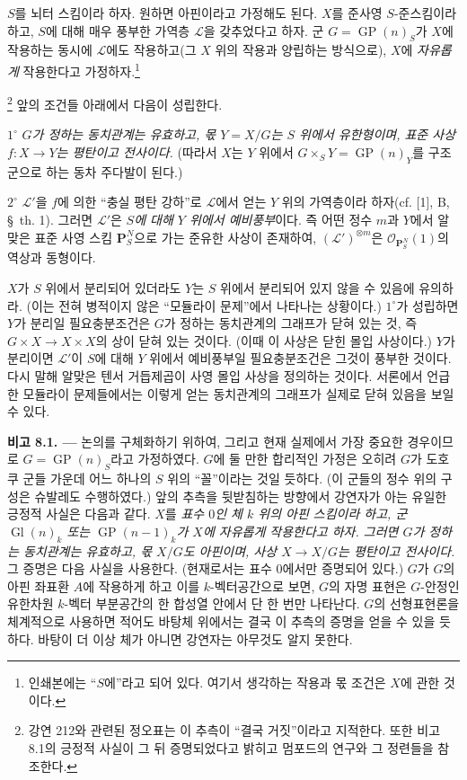 $S$를 뇌터 스킴이라 하자. 원하면 아핀이라고 가정해도 된다. $X$를
준사영 $S$-준스킴이라 하고, $S$에 대해 매우 풍부한 가역층
$\mathcal L$을 갖추었다고 하자. 군 $G=\operatorname{GP}(n)_S$가 $X$에
작용하는 동시에 $\mathcal L$에도 작용하고(그 $X$ 위의 작용과 양립하는
방식으로), $X$에 \emph{자유롭게} 작용한다고 가정하자.\footnote{인쇄본에는
``$S$에''라고 되어 있다. 여기서 생각하는 작용과 몫 조건은 $X$에 관한
것이다.}

\footnote{강연 212와 관련된 정오표는 이 추측이
``결국 거짓''이라고 지적한다. 또한 비고 8.1의 긍정적 사실이 그 뒤
증명되었다고 밝히고 멈포드의 연구와 그 정련들을 참조한다.} 앞의 조건들
아래에서 다음이 성립한다.

\smallskip
\noindent $1^\circ$ \emph{$G$가 정하는 동치관계는 유효하고, 몫
$Y=X/G$는 $S$ 위에서 유한형이며, 표준 사상 $f:X\to Y$는 평탄이고
전사이다.} (따라서 $X$는 $Y$ 위에서
$G\times_S Y=\operatorname{GP}(n)_Y$를 구조군으로 하는 동차 주다발이
된다.)

\smallskip
\noindent $2^\circ$ $\mathcal L'$을 $f$에 의한 ``충실 평탄 강하''로
$\mathcal L$에서 얻는 $Y$ 위의 가역층이라 하자(cf. [1], B,
\S~th. 1). 그러면 $\mathcal L'$은 \emph{$S$에 대해 $Y$ 위에서
예비풍부}이다. 즉 어떤 정수 $m$과 $Y$에서 알맞은 표준 사영 스킴
$\mathbf P_S^N$으로 가는 준유한 사상이 존재하여,
$(\mathcal L')^{\otimes m}$은 $\mathcal O_{\mathbf P_S^N}(1)$의 역상과
동형이다.

$X$가 $S$ 위에서 분리되어 있더라도 $Y$는 $S$ 위에서 분리되어 있지 않을
수 있음에 유의하라. (이는 전혀 병적이지 않은 ``모듈라이 문제''에서
나타나는 상황이다.) $1^\circ$가 성립하면 $Y$가 분리일 필요충분조건은
$G$가 정하는 동치관계의 그래프가 닫혀 있는 것, 즉
$G\times X\to X\times X$의 상이 닫혀 있는 것이다. (이때 이 사상은
닫힌 몰입 사상이다.) $Y$가 분리이면 $\mathcal L'$이 $S$에 대해 $Y$
위에서 예비풍부일 필요충분조건은 그것이 풍부한 것이다. 다시 말해
알맞은 텐서 거듭제곱이 사영 몰입 사상을 정의하는 것이다. 서론에서
언급한 모듈라이 문제들에서는 이렇게 얻는 동치관계의 그래프가 실제로
닫혀 있음을 보일 수 있다.

\medskip
\noindent\textbf{비고 8.1. ---} 논의를 구체화하기 위하여, 그리고 현재
실제에서 가장 중요한 경우이므로 $G=\operatorname{GP}(n)_S$라고
가정하였다. $G$에 둘 만한 합리적인 가정은 오히려 $G$가 도호쿠 군들
가운데 어느 하나의 $S$ 위의 ``꼴''이라는 것일 듯하다. (이 군들의
정수 위의 구성은 슈발레도 수행하였다.) 앞의 추측을 뒷받침하는 방향에서
강연자가 아는 유일한 긍정적 사실은 다음과 같다. $X$를 \emph{표수 $0$인
체 $k$ 위의 아핀 스킴이라 하고, 군 $\operatorname{Gl}(n)_k$ 또는
$\operatorname{GP}(n-1)_k$가 $X$에 자유롭게 작용한다고 하자. 그러면
$G$가 정하는 동치관계는 유효하고, 몫 $X/G$도 아핀이며, 사상
$X\to X/G$는 평탄이고 전사이다.} 그 증명은 다음 사실을 사용한다.
(현재로서는 표수 $0$에서만 증명되어 있다.) $G$가 $G$의 아핀 좌표환
$A$에 작용하게 하고 이를 $k$-벡터공간으로 보면, $G$의 자명 표현은
$G$-안정인 유한차원 $k$-벡터 부분공간의 한 합성열 안에서 단 한 번만
나타난다. $G$의 선형표현론을 체계적으로 사용하면
적어도 바탕체 위에서는 결국 이 추측의 증명을 얻을 수 있을 듯하다.
바탕이 더 이상 체가 아니면 강연자는 아무것도 알지 못한다.

